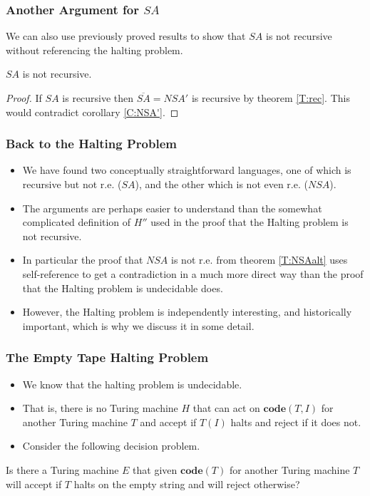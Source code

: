 \documentclass[handout]{beamer}
\newcommand{\co}{\mathbf{code}}
\begin{document}
\begin{frame}
\frametitle{Another Argument for $SA$}
We can also use previously proved results to show that $SA$ is not recursive without referencing the halting problem.
\vspace{0.4cm}
\begin{theorem}
$SA$ is not recursive.
\end{theorem}
\begin{proof}
\vspace{0.4cm}
If $SA$ is recursive then $\overline{SA}=NSA'$ is recursive by theorem \ref{T:rec}. This would contradict corollary \ref{C:NSA'}.
\end{proof}
\end{frame}

\begin{frame}
\frametitle{Back to the Halting Problem}
\begin{itemize}
\item We have found two conceptually straightforward languages, one of which is recursive but not r.e. ($SA$), and the other which is not even r.e. ($NSA$). 
\vspace{0.1cm}
\item The arguments are perhaps easier to understand than the somewhat complicated definition of $H''$ used in the proof that the Halting problem is not recursive. 
\vspace{0.1cm}
\item In particular the proof that $NSA$ is not r.e. from theorem \ref{T:NSAalt} uses self-reference to get a contradiction in a much more direct way than the proof that the Halting problem is undecidable does. 
\vspace{0.1cm}
\item However, the Halting problem is independently interesting, and historically important, which is why we discuss it in some detail.
\end{itemize}
\end{frame}

\begin{frame}
\frametitle{The Empty Tape Halting Problem}
\begin{itemize}
\item We know that the halting problem is undecidable. 
\vspace{0.2cm}
\item That is, there is no Turing machine $H$ that can act on $\co(T,I)$ for another Turing machine $T$ and accept if $T(I)$ halts and reject if it does not.
\vspace{0.2cm} 
\item Consider the following decision problem.
\end{itemize}
\begin{definition}
Is there a Turing machine $E$ that given $\co(T)$ for another Turing machine $T$ will accept if $T$ halts on the empty string and will reject otherwise?
\end{definition}
\end{frame}
\end{document}
